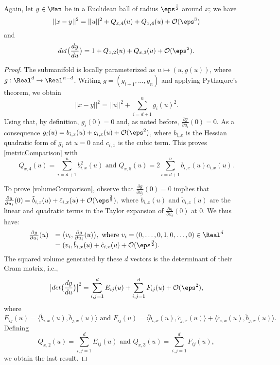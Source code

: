 \begin{theorem}
Again, let $y\in\Man$ be in a Euclidean ball of radius $\eps^\frac{1}{2}$ around $x$; we have
\begin{equation}\label{metricComparison}
||x-y||^2=||u||^2+Q_{x,4}(u)+Q_{x,4}(u)+\mathcal{O}(\eps^3)
\end{equation}
and
\begin{equation}\label{volumeComparison}
det\big(\frac{dy}{du}\big)=1+Q_{x,2}(u)+Q_{x,3}(u)+\mathcal{O}(\eps^2).
\end{equation}
\end{theorem}
\begin{proof}
The submanifold is locally parameterized as $u\mapsto(u,g(u))$, where $g:\Real^d\rightarrow\Real^{n-d}$. Writing $g=(g_{i+1},\dots,g_n)$ and applying Pythagore's theorem, we obtain
\begin{equation*}
||x-y||^2=||u||^2+\sum_{i=d+1}^n g_i(u)^2.
\end{equation*}
Using that, by definition, $g_i(0)=0$ and, as noted before, $\frac{\partial g}{\partial u_i}(0)=0$. As a consequence $g_i(u)=b_{i,x}(u)+c_{i,x}(u)+\mathcal{O}(\eps^2)$, where $b_{i,x}$ is the Hessian quadratic form of $g_i$ at $u=0$ and $c_{i,x}$ is the cubic term. This proves \ref{metricComparison} with
\begin{equation*}
Q_{x,4}(u)=\sum_{i=d+1}^n b_{i,x}^2(u) \text{ and } Q_{x,5}(u)=2\sum_{i=d+1}^n b_{i,x}(u)c_{i,x}(u).
\end{equation*}

To prove \ref{volumeComparison}, observe that $\frac{\partial g}{\partial u_i}(0)=0$ implies that $\frac{\partial g}{\partial u_i}(0)=\tilde{b}_{i,x}(u)+\tilde{c}_{i,x}(u)+\mathcal{O}(\eps^\frac{3}{2})$, where $\tilde{b}_{i,x}(u)$ and $\tilde{c}_{i,x}(u)$ are the linear and quadratic terms in the Taylor expansion of $\frac{\partial g}{\partial u_i}(0)$ at $0$. We thus have:
\begin{equation*}\begin{array}{l l}
\frac{\partial y}{\partial u_i}(u)&=\big(v_i,\frac{\partial g}{\partial u_i}(u)\big), \text{ where } v_i=(0,\dots,0,1,0,\dots,0)\in\Real^d \\
&=(v_i,\tilde{b}_{i,x}(u)+\tilde{c}_{i,x}(u)+\mathcal{O}(\eps^\frac{3}{2}).
\end{array}\end{equation*}
The squared volume generated by these $d$ vectors is the determinant of their Gram matrix, i.e.,
\begin{equation*}
\big| det\big(\frac{dy}{du} \big)\big|^2=\sum_{i,j=1}^d E_{ij}(u)+\sum_{i,j=1}^d F_{ij}(u)+\mathcal{O}(\eps^2),
\end{equation*}
where
\begin{equation*}
E_{ij}(u)=\langle \tilde{b}_{i,x}(u),\tilde{b}_{j,x}(u)\rangle \text{ and } F_{ij}(u)=\langle \tilde{b}_{i,x}(u),\tilde{c}_{j,x}(u)\rangle + \langle \tilde{c}_{i,x}(u),\tilde{b}_{j,x}(u)\rangle.
\end{equation*}
Defining
\begin{equation*}
Q_{x,2}(u)=\sum_{i,j=1}^d E_{ij}(u) \text{ and } Q_{x,3}(u)=\sum_{i,j=1}^d F_{ij}(u),
\end{equation*}
we obtain the last result.
\end{proof}

